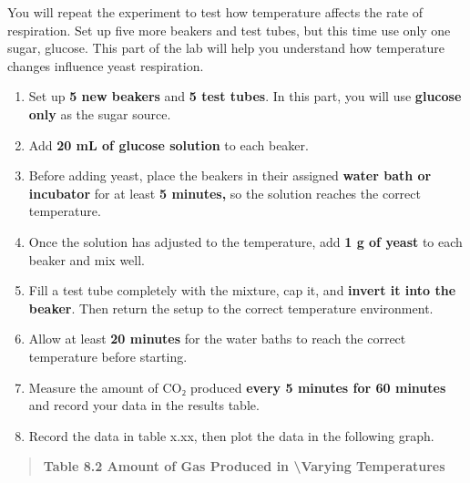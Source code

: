 \documentclass[
  letterpaper,
  DIV=11,
  numbers=noendperiod]{scrreprt}
\begin{document}
You will repeat the experiment to test how temperature affects the rate
of respiration. Set up five more beakers and test tubes, but this time
use only one sugar, glucose. This part of the lab will help you
understand how temperature changes influence yeast respiration.

\begin{enumerate}
\def\labelenumi{\arabic{enumi}.}
\item
  Set up \textbf{5 new beakers} and \textbf{5 test tubes}. In this part,
  you will use \textbf{glucose only} as the sugar source.
\item
  Add \textbf{20 mL of glucose solution} to each beaker.
\item
  Before adding yeast, place the beakers in their assigned \textbf{water
  bath or incubator} for at least \textbf{5 minutes,} so the solution
  reaches the correct temperature.
\item
  Once the solution has adjusted to the temperature, add \textbf{1 g of
  yeast} to each beaker and mix well.
\item
  Fill a test tube completely with the mixture, cap it, and
  \textbf{invert it into the beaker}. Then return the setup to the
  correct temperature environment.
\item
  Allow at least \textbf{20 minutes} for the water baths to reach the
  correct temperature before starting.
\item
  Measure the amount of CO₂ produced \textbf{every 5 minutes for 60
  minutes} and record your data in the results table.
\item
  Record the data in table x.xx, then plot the data in the following
  graph.
\end{enumerate}

\begin{quote}
\textbf{Table 8.2 Amount of Gas Produced in \textbackslash Varying
Temperatures}
\end{quote}
\end{document}
